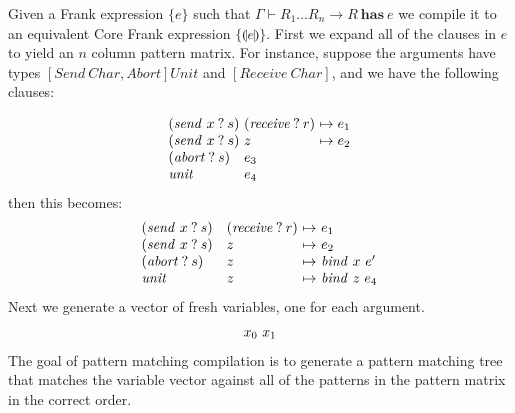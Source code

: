 \documentclass[preprint]{sigplanconf}
\newcommand{\pc}[1]{\llparenthesis{#1}\rrparenthesis}
\newcommand\ba{\begin{array}}
\newcommand\ea{\end{array}}
\newcommand{\judgeword}[1]{~\mathbf{#1}~}
\newcommand{\idoes}[3]{#1 \vdash {#2} \judgeword{has} {#3}}
\newcommand{\idoesg}{\idoes{\Gamma}}
\newcommand{\effbox}[1]{[#1]}
\newcommand{\var}{\mathit}
\newcommand{\handleSymbol}{\mathbin{?}}
\newcommand{\handle}[2]{{#1} \handleSymbol {#2}}
\newcommand{\thunk}[1]{\{{#1}\}}
\begin{document}
\begin{sloppypar}
Given a Frank expression $\thunk{e}$ such that $\idoesg{R_1 \dots R_n
  \to R}{e}$
%
we compile it to an equivalent Core Frank expression $\thunk{\pc{e}}$.
%
First we expand all of the clauses in $e$ to yield an $n$ column
pattern matrix. For instance, suppose the arguments have types
$\effbox{\var{Send~Char}, \var{Abort}}\var{Unit}$ and
$\effbox{\var{Receive~Char}}$, and we have the following clauses:
\end{sloppypar}
\[
\ba{@{}l@{~}l@{~}l@{}}
  (\handle{\var{send}~x}{s}) & (\handle{\var{receive}}{r}) & \mapsto e_1 \\
  (\handle{\var{send}~x}{s}) & z & \mapsto e_2 \\
  (\handle{\var{abort}}{s})  & e_3 \\
  \var{unit} & e_4 \\
\ea
\]
%
then this becomes:
%
\[
\ba{@{}l@{\quad}l@{~\mapsto~}l@{}}
  (\handle{\var{send}~x}{s}) & (\handle{\var{receive}}{r}) & e_1 \\
  (\handle{\var{send}~x}{s}) & z & e_2 \\
  (\handle{\var{abort}}{s})  & z & \var{bind}~x~e' \\
  \var{unit}                 & z & \var{bind}~z~e_4 \\
\ea
\]
%
Next we generate a vector of fresh variables, one for each argument.
\[
\ba{@{}l@{~}l@{}}
  x_0 & x_1
\ea
\]
The goal of pattern matching compilation is to generate a pattern
matching tree that matches the variable vector against all of the
patterns in the pattern matrix in the correct order.
\end{document}
